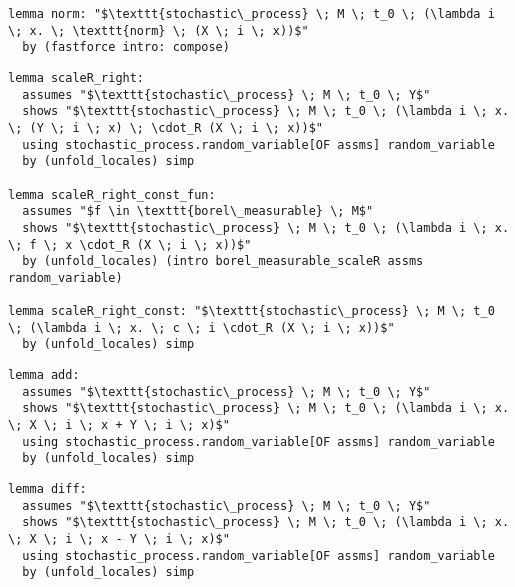 \begin{isalemma}
{\small
\begin{lstlisting}[style=isabelle]
lemma norm: "$\texttt{stochastic\_process} \; M \; t_0 \; (\lambda i \; x. \; \texttt{norm} \; (X \; i \; x))$" 
  by (fastforce intro: compose)
  \end{lstlisting}
}
\end{isalemma}

\begin{isalemma}
{\small
\begin{lstlisting}[style=isabelle]
lemma scaleR_right:
  assumes "$\texttt{stochastic\_process} \; M \; t_0 \; Y$"
  shows "$\texttt{stochastic\_process} \; M \; t_0 \; (\lambda i \; x. \; (Y \; i \; x) \; \cdot_R (X \; i \; x))$"
  using stochastic_process.random_variable[OF assms] random_variable 
  by (unfold_locales) simp

lemma scaleR_right_const_fun: 
  assumes "$f \in \texttt{borel\_measurable} \; M$" 
  shows "$\texttt{stochastic\_process} \; M \; t_0 \; (\lambda i \; x. \; f \; x \cdot_R (X \; i \; x))$" 
  by (unfold_locales) (intro borel_measurable_scaleR assms random_variable)

lemma scaleR_right_const: "$\texttt{stochastic\_process} \; M \; t_0 \; (\lambda i \; x. \; c \; i \cdot_R (X \; i \; x))$"
  by (unfold_locales) simp
\end{lstlisting}
}
\end{isalemma}


\begin{isalemma}
{\small
\begin{lstlisting}[style=isabelle]
lemma add:
  assumes "$\texttt{stochastic\_process} \; M \; t_0 \; Y$"
  shows "$\texttt{stochastic\_process} \; M \; t_0 \; (\lambda i \; x. \; X \; i \; x + Y \; i \; x)$"
  using stochastic_process.random_variable[OF assms] random_variable 
  by (unfold_locales) simp
\end{lstlisting}
}
\end{isalemma}

\begin{isalemma}
{\small
\begin{lstlisting}[style=isabelle]
lemma diff:
  assumes "$\texttt{stochastic\_process} \; M \; t_0 \; Y$"
  shows "$\texttt{stochastic\_process} \; M \; t_0 \; (\lambda i \; x. \; X \; i \; x - Y \; i \; x)$"
  using stochastic_process.random_variable[OF assms] random_variable 
  by (unfold_locales) simp
\end{lstlisting}
}
\end{isalemma}

